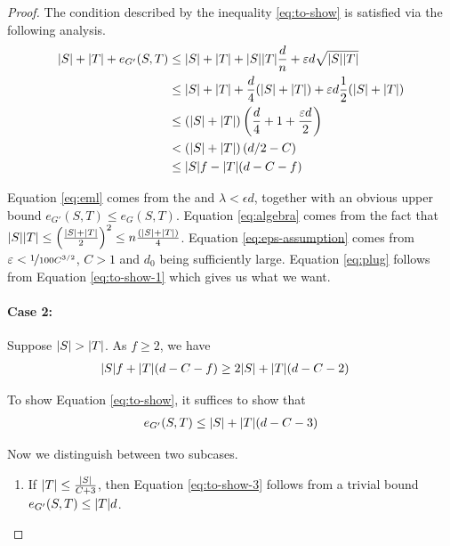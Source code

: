 \documentclass[11pt]{article}
\begin{document}
\begin{proof}
  The condition described by the inequality \eqref{eq:to-show} is satisfied via the following analysis.
\begin{align}
  |S| + |T| + \CutEdges{S}{T}{G'} &\le  |S| + |T| + |S||T|\frac{d}{n} + \epsilon d \sqrt{\Size{S}\Size{T}} \label{eq:eml}\\
                                 &\le |S| + |T| + \frac{d}{4}(\Size{S} + \Size{T}) + \epsilon d \frac{1}{2}(\Size{S} + \Size{T}) \label{eq:algebra}\\
                                 &\le (\Size{S} + \Size{T})\left(\frac{d}{4} + 1 + \frac{
                                   \epsilon d}{2}\right) \\
                                 &<  (\Size{S} + \Size{T})\left(d/2-C\right) \label{eq:eps-assumption}\\
                                 &\le \Size{S}f - \Size{T}(d-C-f) \label{eq:plug}
 \end{align}  
  
Equation \eqref{eq:eml} comes from the  and $\lambda < \epsilon d$, together with an obvious upper bound $e_{G'}(S, T) \le e_G(S, T)$.
Equation \eqref{eq:algebra} comes from the fact that $\Size{S}\Size{T} \leq \left(\frac{\Size{S}+\Size{T}}{2}\right)^2 \le n\frac{(\Size{S}+\Size{T})}{4}$.
Equation \eqref{eq:eps-assumption} comes from $\epsilon < \nicefrac{1}{100C^{3/2}}$, $C >1$ and $d_0$ being sufficiently large. Equation \eqref{eq:plug} follows from Equation \eqref{eq:to-show-1} which gives us what we want.

\paragraph{Case 2:} Suppose $\Size{S} > \Size{T}$. As $f \ge 2$, we have
  \begin{align}
    \Size{S}f +  \Size{T}(d-C-f)  &\ge 2\Size{S} +\Size{T}(d-C-2) \label{eq:to-show-2}
  \end{align}
  
  To show Equation \eqref{eq:to-show}, it suffices to show that
\begin{align}
  \CutEdges{S}{T}{G'} \leq \Size{S} + \Size{T}(d-C-3) \label{eq:to-show-3}
\end{align}

Now we distinguish between two subcases.

\begin{enumerate}

\item{
    If $\Size{T} \le \frac{\Size{S}}{C+3}$, then Equation \eqref{eq:to-show-3} follows from a trivial bound $\CutEdges{S}{T}{G'} \leq \Size{T}d$.
  }


\end{enumerate}
\end{proof}
\end{document}
